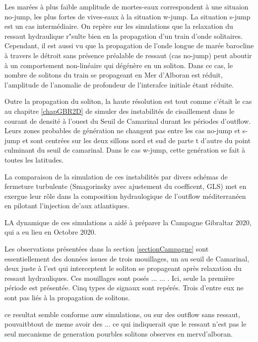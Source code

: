 Les marées à plus faible amplitude de mortes-eaux correspondent à une situaion no-jump, les plus fortes de vives-eaux à la situation w-jump. La situation s-jump est un cas intermédiaire. On repère sur les simulations que la relaxation du ressaut hydraulique r"sulte bien en la propagation d'un train d'onde solitaires. Cependant, il est aussi vu que la propagation de l'onde longue de marée barocline à travers le détroit sans présence préalable de ressaut (cas no-jump) peut aboutir à un comportement non-linéaire qui dégénère en un soliton. Dans ce cas, le nombre de solitons du train se propageant en Mer d'Alboran est réduit, l'amplitude de l'anomalie de profondeur de l'interafce initiale étant réduite.

Outre la propagation du soliton, la haute résolution est tout comme c'était le cas au chapitre \ref{chapGBR2D} de simuler des instabilités de cisaillement dans le courant de densité à l'ouest du Seuil de Camarinal durant les périodes d'outflow. Leurs zones probables de génération ne changent pas entre les cas no-jump et s-jump et sont centrées sur les deux sillons nord et sud de parte t d'autre du point culminant du seuil de camarinal. Dans le cas w-jump, cette genération se fait à toutes les latitudes.

La comparaison de la simulation de ces instabilités par divers schémas de fermeture turbulente (Smagorinsky avec ajustement du coefficent, GLS) met en exergue leur rôle dans la composition hydraulogique de l'outflow méditerranéen en pilotant l'injection de'aux atlantiques.

LA dynamique de ces simulations a aidé à préparer la Campagne Gibraltar 2020, qui a eu lieu en Octobre 2020.

Les observations présentées dans la section \ref{sectionCampagne} sont essentiellement des données issues de trois mouillages, un au seuil de Camarinal, deux juste à l'est qui interceptent le soliton se propageant après relaxation du ressaut hydrauliques. Ces mouillages sont posés ... ... . Ici, seule la première période est présentée. Cinq types de signaux sont repérés. Trois d'entre eux ne sont pas liés à la propagation de solitons.

ce resultat semble conforme auw simulations, ou sur des outflow sans ressaut, pouvaitbtout de meme avoir des ... ce qui indiquerait que le ressaut n’est pas le seul mecanisme de generation pourbles solitons observes en mervd’alboran.




